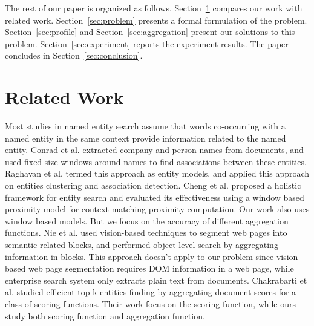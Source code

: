 \documentclass{sig-alternate}
\theoremstyle{definition}
\begin{document}
The rest of our paper is organized as follows. Section~\ref{sec:related-work} compares our work with related work. Section~\ref{sec:problem} presents a formal formulation of the problem. Section~\ref{sec:profile} and Section~\ref{sec:aggregation} present our solutions to this problem. Section~\ref{sec:experiment} reports the experiment results. The paper concludes in Section~\ref{sec:conclusion}.

\section{Related Work}\label{sec:related-work}
Most studies in named entity search assume that words co-occurring with a named entity in the same context provide information related to the named entity. Conrad et al. \cite{conrad1994system} extracted company and person names from documents, and used fixed-size windows around names to find associations between these entities. Raghavan et al. \cite{raghavan2004exploration} termed this approach as entity models, and applied this approach on entities clustering and association detection. Cheng et al. \cite{cheng2007entityrank} proposed a holistic framework for entity search and evaluated its effectiveness using a window based proximity model for context matching proximity computation. Our work also uses window based models. But we focus on the accuracy of different aggregation functions. Nie et al. \cite{nie2007object} used vision-based techniques to segment web pages into semantic related blocks, and performed object level search by aggregating information in blocks. This approach doesn't apply to our problem since vision-based web page segmentation requires DOM information in a web page, while enterprise search system only extracts plain text from documents. Chakrabarti et al. \cite{chakrabarti2006ranking} studied efficient top-k entities finding by aggregating document scores for a class of scoring functions. Their work focus on the scoring function, while ours study both scoring function and aggregation function.
\end{document}

